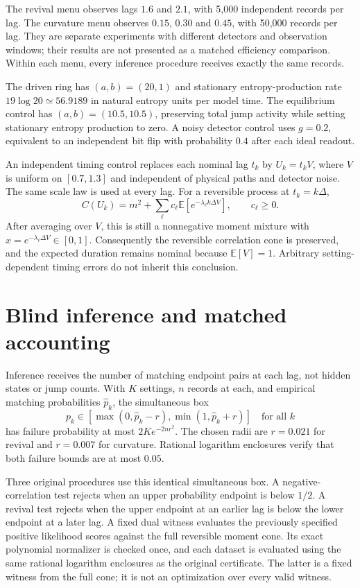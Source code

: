 The revival menu observes lags $1.6$ and $2.1$, with 5,000 independent
records per lag. The curvature menu observes $0.15$, $0.30$ and $0.45$,
with 50,000 records per lag. They are separate experiments with different
detectors and observation windows; their results are not presented as a
matched efficiency comparison. Within each menu, every inference procedure
receives exactly the same records.

The driven ring has $(a,b)=(20,1)$ and stationary entropy-production rate
$19\log20\simeq56.9189$ in natural entropy units per model time. The
equilibrium control has $(a,b)=(10.5,10.5)$, preserving total jump activity
while setting stationary entropy production to zero. A noisy detector
control uses $g=0.2$, equivalent to an independent bit flip with probability
$0.4$ after each ideal readout.

An independent timing control replaces each nominal lag $t_k$ by
$U_k=t_kV$, where $V$ is uniform on $[0.7,1.3]$ and independent of physical
paths and detector noise. The same scale law is used at every lag. For a
reversible process at $t_k=k\Delta$,
\[
 C(U_k)=m^2+\sum_\ell c_\ell\mathbb E
       [e^{-\lambda_\ell k\Delta V}],\qquad c_\ell\ge0.
\]
After averaging over $V$, this is still a nonnegative moment mixture with
$x=e^{-\lambda_\ell\Delta V}\in[0,1]$. Consequently the reversible
correlation cone is preserved, and the expected duration remains nominal
because $\mathbb E[V]=1$. Arbitrary setting-dependent timing errors do not
inherit this conclusion.

\section{Blind inference and matched accounting}

Inference receives the number of matching endpoint pairs at each lag,
not hidden states or jump counts. With $K$ settings, $n$ records at each,
and empirical matching probabilities $\widehat p_k$, the simultaneous box
\begin{equation}
 p_k\in[\max(0,\widehat p_k-r),\min(1,\widehat p_k+r)]
 \quad\text{for all }k
\end{equation}
has failure probability at most $2K e^{-2nr^2}$. The chosen radii are
$r=0.021$ for revival and $r=0.007$ for curvature. Rational logarithm
enclosures verify that both failure bounds are at most $0.05$.

Three original procedures use this identical simultaneous box. A
negative-correlation test rejects when an upper probability endpoint is
below $1/2$. A revival test rejects when the upper endpoint at an earlier
lag is below the lower endpoint at a later lag. A fixed dual witness
evaluates the previously specified positive likelihood scores against the
full reversible moment cone. Its exact polynomial normalizer is checked
once, and each dataset is evaluated using the same rational logarithm
enclosures as the original certificate. The latter is a fixed witness from
the full cone; it is not an optimization over every valid witness.

